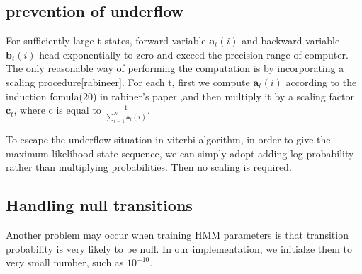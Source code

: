 \subsection{prevention of underflow}

For sufficiently large t states, forward variable $\textbf{a}_t(i)$ and backward variable  $\textbf{b}_t(i)$ head exponentially to zero and exceed the precision range of computer. The only reasonable way of performing the computation is by incorporating a scaling procedure[rabineer].
For each t, first we compute $\textbf{a}_t(i)$ according to the induction fomula(20) in rabiner's paper \cite{Rabiner1989},and then multiply it by a scaling factor  $\textbf{c}_t$, where c is equal to $ \frac{1}{ \displaystyle\sum_{i=1}^N \textbf{a}_t(i)}$.

To escape the underflow situation in viterbi algorithm, in order to give the maximum likelihood state sequence, we can simply adopt adding log probability rather than multiplying probabilities. Then no scaling is required.

\subsection{Handling null transitions}
Another problem may occur when training HMM parameters is that transition probability is very likely to be null. In our implementation, we initialze them to very small number, such as \textbf{ $10^{-10}$}.



